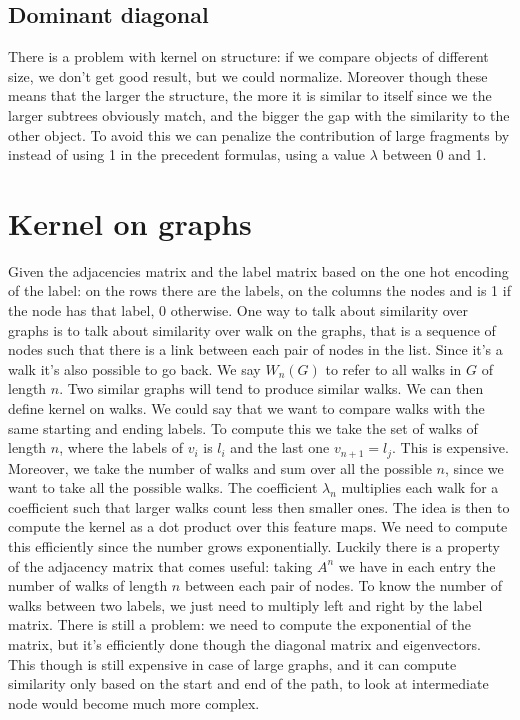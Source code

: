 \subsection{Dominant diagonal}
There is a problem with kernel on structure: if we compare objects of different size, we don't get good result, but we could normalize. Moreover though these means that the larger the structure, the more it is similar to itself since we the larger subtrees obviously match, and the bigger the gap with the similarity to the other object. To avoid this we can penalize the contribution of large fragments by instead of using 1 in the precedent formulas, using a value $\lambda$ between 0 and 1. 
\section{Kernel on graphs}
Given the adjacencies matrix and the label matrix based on the one hot encoding of the label: on the rows there are the labels, on the columns the nodes and is 1 if the node has that label, 0 otherwise. \newline
One way to talk about similarity over graphs is to talk about similarity over walk on the graphs, that is a sequence of nodes such that there is a link between each pair of nodes in the list. Since it's a walk it's also possible to go back. We say $W_n(G)$ to refer to all walks in $G$ of length $n$. Two similar graphs will tend to produce similar walks. \newline
We can then define kernel on walks. We could say that we want to compare walks with the same starting and ending labels. To compute this we take the set of walks of length $n$, where the labels of $v_i$ is $l_i$ and the last one $v_{n+1}=l_j$. This is expensive. Moreover, we take the number of walks and sum over all the possible $n$, since we want to take all the possible walks. The coefficient $\lambda_n$ multiplies each walk for a coefficient such that larger walks count less then smaller ones. The idea is then to compute the kernel as a dot product over this feature maps. \newline
We need to compute this efficiently since the number grows exponentially. Luckily there is a property of the adjacency matrix that comes useful: taking $A^n$ we have in each entry the number of walks of length $n$ between each pair of nodes. To know the number of walks between two labels, we just need to multiply left and right by the label matrix. \newline
There is still a problem: we need to compute the exponential of the matrix, but it's efficiently done though the diagonal matrix and eigenvectors. This though is still expensive in case of large graphs, and it can compute similarity only based on the start and end of the path, to look at intermediate node would become much more complex. \newline
